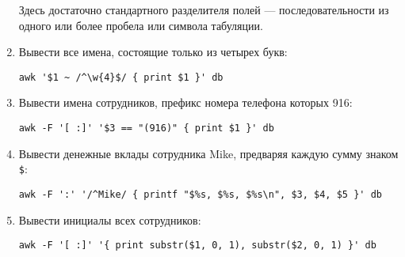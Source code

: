\documentclass[listings]{labreport}
\begin{document}
\begin{enumerate}
\begin{small}
  Здесь достаточно стандартного разделителя полей — последовательности
  из одного или более пробела или символа табуляции.
\end{small}

\item Вывести все имена, состоящие только из четырех букв:
\begin{verbatim}
awk '$1 ~ /^\w{4}$/ { print $1 }' db
\end{verbatim}

\item Вывести имена сотрудников, префикс номера телефона которых 916:
\begin{verbatim}
awk -F '[ :]' '$3 == "(916)" { print $1 }' db
\end{verbatim}

\item Вывести денежные вклады сотрудника Mike, предваряя каждую сумму знаком \verb|$|:
\begin{verbatim}
awk -F ':' '/^Mike/ { printf "$%s, $%s, $%s\n", $3, $4, $5 }' db
\end{verbatim}

\item Вывести инициалы всех сотрудников:
\begin{verbatim}
awk -F '[ :]' '{ print substr($1, 0, 1), substr($2, 0, 1) }' db
\end{verbatim}

\end{enumerate}
\end{document}
